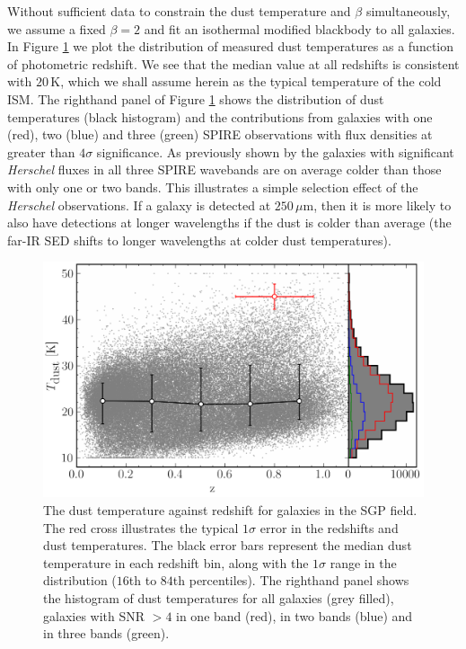 Without sufficient data to constrain the dust temperature and $\beta$ simultaneously, we assume a fixed $\beta = 2$ and fit an isothermal modified blackbody to all galaxies. In Figure \ref{fig:dust_temperatures} we plot the distribution of measured dust temperatures as a function of photometric redshift. We see that the median value at all redshifts is consistent with $20\,$K, which we shall assume herein as the typical temperature of the cold ISM. The righthand panel of Figure \ref{fig:dust_temperatures} shows the distribution of dust temperatures (black histogram) and the contributions from galaxies with one (red), two (blue) and three (green) SPIRE observations with flux densities at greater than $4\sigma$ significance. As previously shown by \citealt{Beeston_2018} the galaxies with significant \textit{Herschel} fluxes in all three SPIRE wavebands are on average colder than those with only one or two bands. This illustrates a simple selection effect of the \textit{Herschel} observations. If a galaxy is detected at $250\,\mu$m, then it is more likely to also have detections at longer wavelengths if the dust is colder than average (the far-IR SED shifts to longer wavelengths at colder dust temperatures).

\begin{figure}
	\centering
	\includegraphics[width=0.8\columnwidth]{Figures/dust_temperatures.pdf}
	\caption[The distribution of dust temperatures as a function of redshift]{The dust temperature against redshift for galaxies in the SGP field. The red cross illustrates the typical $1\sigma$ error in the redshifts and dust temperatures. The black error bars represent the median dust temperature in each redshift bin, along with the $1\sigma$ range in the distribution ($16$th to $84$th percentiles). The righthand panel shows the histogram of dust temperatures for all galaxies (grey filled), galaxies with SNR $> 4$ in one band (red), in two bands (blue) and in three bands (green).}
	\label{fig:dust_temperatures}
\end{figure}

